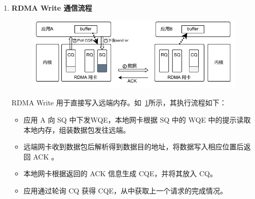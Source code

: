 {\begin{enumerate}[label=\arabic*.]
              RDMA Read 用于直接读取远端内存。如~\ref{fig:rdma-Read}所示，其执行流程如下：
              \begin{itemize}
                  \item 应用 A 向 SQ 中下发WQE，本地网卡根据 SQ 中的 WQE 向远端发送读取请求包。
                  \item 远端网卡接收到读取请求包后，根据包中携带的信息，读取应用 B 相应位置的内存，并发回数据。
                  \item 本地网卡接收到数据，根据 WQE 的信息将数据存入应用 A 的内存，并向 CQ 中存入CQE。
                  \item 应用通过轮询 CQ 获得 CQE，从中获取上一个请求的完成情况。
              \end{itemize}

        \item \textbf{RDMA Write 通信流程}
              \begin{figure}[!htbp]
                  \centering
                  \includegraphics[width=\linewidth]{Img/RDMA-Write通信流程图.pdf}
                  \label{fig:rdma-Write}
              \end{figure}

              RDMA Write 用于直接写入远端内存。如~\ref{fig:rdma-Write}所示，其执行流程如下：
              \begin{itemize}
                  \item 应用 A 向 SQ 中下发WQE，本地网卡根据 SQ 中的 WQE 中的提示读取本地内存，组装数据包发往远端。
                  \item 远端网卡收到数据包后解析得到数据目的地址，将数据写入相应位置后返回 ACK 。
                  \item 本地网卡根据返回的 ACK 信息生成 CQE，并将其放入 CQ。
                  \item 应用通过轮询 CQ 获得 CQE，从中获取上一个请求的完成情况。
              \end{itemize}
    \end{enumerate}

}
